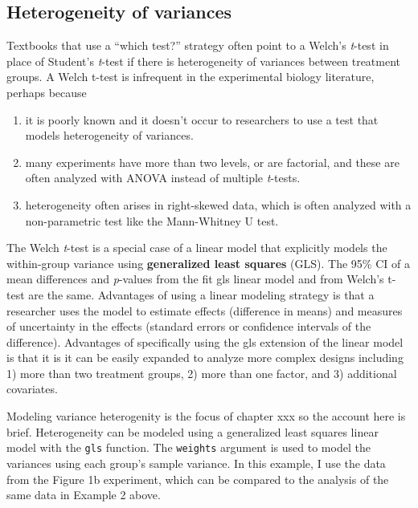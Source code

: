 \documentclass[]{book}
\providecommand{\tightlist}{%
  \setlength{\itemsep}{0pt}\setlength{\parskip}{0pt}}
\begin{document}
\hypertarget{heterogeneity-of-variances}{%
\subsection{Heterogeneity of variances}\label{heterogeneity-of-variances}}

Textbooks that use a ``which test?'' strategy often point to a Welch's \emph{t}-test in place of Student's \emph{t}-test if there is heterogeneity of variances between treatment groups. A Welch t-test is infrequent in the experimental biology literature, perhaps because

\begin{enumerate}
\def\labelenumi{\arabic{enumi}.}
\tightlist
\item
  it is poorly known and it doesn't occur to researchers to use a test that models heterogeneity of variances.
\item
  many experiments have more than two levels, or are factorial, and these are often analyzed with ANOVA instead of multiple \emph{t}-tests.
\item
  heterogeneity often arises in right-skewed data, which is often analyzed with a non-parametric test like the Mann-Whitney U test.
\end{enumerate}

The Welch \emph{t}-test is a special case of a linear model that explicitly models the within-group variance using \textbf{generalized least squares} (GLS). The 95\% CI of a mean differences and \emph{p}-values from the fit gls linear model and from Welch's t-test are the same. Advantages of using a linear modeling strategy is that a researcher uses the model to estimate effects (difference in means) and measures of uncertainty in the effects (standard errors or confidence intervals of the difference). Advantages of specifically using the gls extension of the linear model is that it is it can be easily expanded to analyze more complex designs including 1) more than two treatment groups, 2) more than one factor, and 3) additional covariates.

Modeling variance heterogenity is the focus of chapter xxx so the account here is brief. Heterogeneity can be modeled using a generalized least squares linear model with the \texttt{gls} function. The \texttt{weights} argument is used to model the variances using each group's sample variance. In this example, I use the data from the Figure 1b experiment, which can be compared to the analysis of the same data in Example 2 above.
\end{document}
